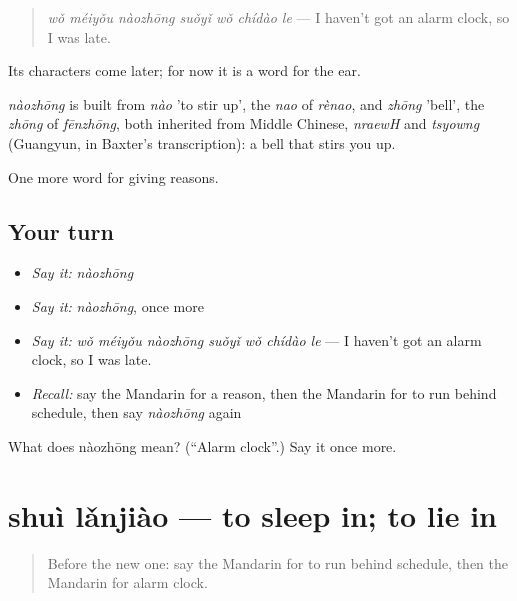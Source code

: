 \begin{quote}
\emph{wǒ méiyǒu nàozhōng suǒyǐ wǒ chídào le} — I haven't got an alarm clock, so I was late.
\end{quote}

Its characters come later; for now it is a word for the ear.

\begin{cousinweb}
\emph{nàozhōng} is built from \emph{nào} 'to stir up', the \emph{nao} of \emph{rènao}, and \emph{zhōng} 'bell', the \emph{zhōng} of \emph{fēnzhōng}, both inherited from Middle Chinese, \emph{nraewH} and \emph{tsyowng} (Guangyun, in Baxter's transcription): a bell that stirs you up.
\end{cousinweb}

\begin{grammarlens}[title={What you've built}]
One more word for giving reasons.
\end{grammarlens}

\subsection*{Your turn}
\begin{itemize}
\raggedright
  \item \emph{Say it:} \emph{nàozhōng}
  \item \emph{Say it:} \emph{nàozhōng}, once more
  \item \emph{Say it:} \emph{wǒ méiyǒu nàozhōng suǒyǐ wǒ chídào le} — I haven't got an alarm clock, so I was late.
  \item \emph{Recall:} say the Mandarin for a reason, then the Mandarin for to run behind schedule, then say \emph{nàozhōng} again
\end{itemize}

\begin{tcolorbox}[breakable,colback=teal!4,colframe=teal!35!black,title={Before you move on}]
What does nàozhōng mean? (\textquotedblleft{}Alarm clock\textquotedblright{}.) Say it once more.
\end{tcolorbox}
\section[shuì lǎnjiào]{shuì lǎnjiào — to sleep in; to lie in}

\label{lesson:ZH-C145-shuilanjiao}



\begin{quote}
Before the new one: say the Mandarin for to run behind schedule, then the Mandarin for alarm clock.
\end{quote}


